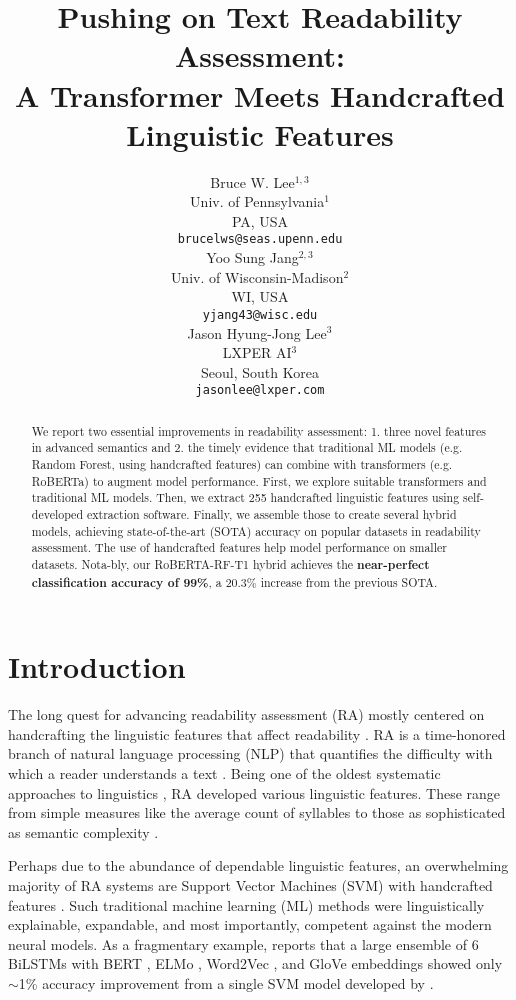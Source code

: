 \documentclass[11pt]{article}
\title{Pushing on Text Readability Assessment: \\A Transformer Meets Handcrafted Linguistic Features}
\author{Bruce W. Lee$^{1,3}$ \\
  Univ. of Pennsylvania$^1$ \\
  PA, USA \\
  \texttt{brucelws@seas.upenn.edu} \\\And
  Yoo Sung Jang$^{2,3}$ \\
  Univ. of Wisconsin-Madison$^2$ \\
  WI, USA \\
  \texttt{yjang43@wisc.edu} \\\And
  Jason Hyung-Jong Lee$^3$ \\
  LXPER AI$^3$ \\
  Seoul, South Korea \\
  \texttt{jasonlee@lxper.com} \\}
\begin{document}
{}
\maketitle{}{}
\begin{abstract}
We report two essential improvements in readability assessment: 1. three novel features in advanced semantics and 2. the timely evidence that traditional ML models (e.g. Random Forest, using handcrafted features) can combine with transformers (e.g. RoBERTa) to augment model performance. First, we explore suitable transformers and traditional ML models. Then, we extract 255 handcrafted linguistic features using self-developed extraction software. Finally, we assemble those to create several hybrid models, achieving state-of-the-art (SOTA) accuracy on popular datasets in readability assessment. The use of handcrafted features help model performance on smaller datasets. Nota-bly, our RoBERTA-RF-T1 hybrid achieves the \textbf{near-perfect classification accuracy of 99\%}, a 20.3\% increase from the previous SOTA.

\end{abstract}

\section{Introduction}
The long quest for advancing readability assessment (RA) mostly centered on handcrafting the linguistic features that affect readability \citep{Pitler:08}. RA is a time-honored branch of natural language processing (NLP) that quantifies the difficulty with which a reader understands a text \citep{Feng:10}. Being one of the oldest systematic approaches to linguistics \citep{Collins-Thompson:14}, RA developed various linguistic features. These range from simple measures like the average count of syllables to those as sophisticated as semantic complexity \citep{buchanan2001characterizing}.

Perhaps due to the abundance of dependable linguistic features, an overwhelming majority of RA systems are Support Vector Machines (SVM) with handcrafted features \citep{Hansen:21}. Such traditional machine learning (ML) methods were linguistically explainable, expandable, and most importantly, competent against the modern neural models. As a fragmentary example, \citet{Fili:19} reports that a large ensemble of 6 BiLSTMs with BERT \citep{bert}, ELMo \citep{elmo}, Word2Vec \citep{word2vec}, and GloVe \citep{glove} embeddings showed only $\sim$1\% accuracy improvement from a single SVM model developed by \citet{Xia:16}.
\end{document}
